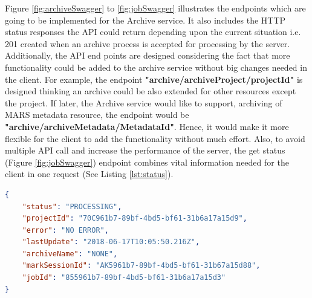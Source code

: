     Figure \ref{fig:archiveSwagger} to \ref{fig:jobSwagger} illustrates the endpoints which are going to be implemented for the Archive service. It also includes the HTTP 
    status responses the API could return depending upon the current situation i.e. 201 created when an archive process is accepted for processing by the server.
    Additionally, the API end points are designed considering the fact that more functionality could be added to the archive service without big changes needed in the client. 
    For example, the endpoint \textbf{"archive/archiveProject/{{projectId}}"} is designed thinking an archive could be also extended for other resources except the project. If later,
    the Archive service would like to support, archiving of MARS metadata resource, the endpoint would be \textbf{"archive/archiveMetadata/{{MetadataId}}"}.
    Hence, it would make it more flexible for the client to add the functionality without much effort. Also, to avoid multiple API call and
    increase the performance of the server, the get status (Figure \ref{fig:jobSwagger}) endpoint combines vital information needed for the client in one 
    request (See Listing \ref{lst:status}). 
    
\newpage
\begin{lstlisting}[caption={Sucessful GET request for a archive status}, language=json,firstnumber=1, captionpos=b, label={lst:status}]
{
    "status": "PROCESSING",
    "projectId": "70C961b7-89bf-4bd5-bf61-31b6a17a15d9",
    "error": "NO ERROR",
    "lastUpdate": "2018-06-17T10:05:50.216Z",
    "archiveName": "NONE",
    "markSessionId": "AK5961b7-89bf-4bd5-bf61-31b67a15d88",
    "jobId": "855961b7-89bf-4bd5-bf61-31b6a17a15d3"
}
\end{lstlisting}







    
